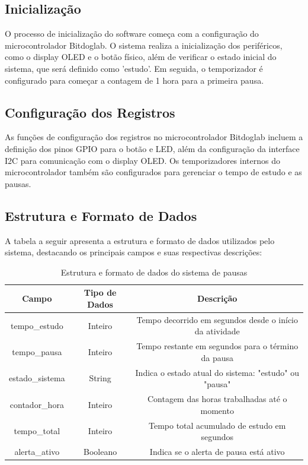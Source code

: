 \documentclass{article}
\begin{document}
\subsection{Inicialização}
O processo de inicialização do software começa com a configuração do microcontrolador Bitdoglab. O sistema realiza a inicialização dos periféricos, como o display OLED e o botão físico, além de verificar o estado inicial do sistema, que será definido como 'estudo'. Em seguida, o temporizador é configurado para começar a contagem de 1 hora para a primeira pausa.

\subsection{Configuração dos Registros}
As funções de configuração dos registros no microcontrolador Bitdoglab incluem a definição dos pinos GPIO para o botão e LED, além da configuração da interface I2C para comunicação com o display OLED. Os temporizadores internos do microcontrolador também são configurados para gerenciar o tempo de estudo e as pausas.

\subsection{Estrutura e Formato de Dados}
A tabela a seguir apresenta a estrutura e formato de dados utilizados pelo sistema, destacando os principais campos e suas respectivas descrições:

\begin{table}[h!]
    \centering
    \begin{tabular}{|c|c|c|}
        \hline
        \textbf{Campo} & \textbf{Tipo de Dados} & \textbf{Descrição} \\ 
        \hline
        tempo\_estudo & Inteiro & Tempo decorrido em segundos desde o início da atividade \\ 
        \hline
        tempo\_pausa & Inteiro & Tempo restante em segundos para o término da pausa \\ 
        \hline
        estado\_sistema & String & Indica o estado atual do sistema: "estudo" ou "pausa" \\ 
        \hline
        contador\_hora & Inteiro & Contagem das horas trabalhadas até o momento \\ 
        \hline
        tempo\_total & Inteiro & Tempo total acumulado de estudo em segundos \\ 
        \hline
        alerta\_ativo & Booleano & Indica se o alerta de pausa está ativo \\ 
        \hline
    \end{tabular}
    \caption{Estrutura e formato de dados do sistema de pausas}
    \label{tab:estrutura_dados}
\end{table}
\end{document}
